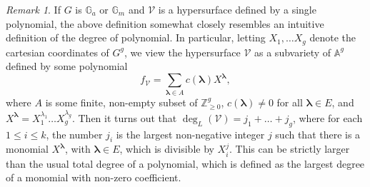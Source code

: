 \documentclass[12pt, reqno]{amsart}
\newcommand{\G}{\mathbb{G}}
\renewcommand{\P}{\mathbb{P}}
\renewcommand{\vec}[1]{\mathbf{#1}}
\newcommand{\Z}{\mathbb{Z}}
\renewcommand{\vec}{\bm}
\theoremstyle{remark}
\newtheorem{remark}[theorem]{Remark}
\newtheorem{example}[theorem]{Example}
\theoremstyle{definition}
\numberwithin{equation}{section}
\begin{document}


        

\begin{remark} \label{exga}
If $G$ is $\G_a$ or $\G_m$ and $\mathcal{V}$ is a hypersurface defined by a single polynomial, the above definition somewhat closely resembles an intuitive definition of the degree of polynomial. In particular, letting $X_1, \dots X_g$ denote the cartesian coordinates of $G^g$, we view the hypersurface $\mathcal{V}$ as a subvariety of $\mathbb{A}^g$ defined by some polynomial 
\[ f_\mathcal{V}= 
\sum_{\vec{\lambda} \in A}c(\vec{\lambda})X^{\vec{\lambda}},\]
where $A$ is some finite, non-empty subset of $\Z_{\geq 0}^g$, $c(\vec{\lambda}) \neq 0$ for all $\vec{\lambda} \in E$, and $X^{\vec{\lambda}} = X_1^{\lambda_1} \dots X_g^{\lambda_g}$. Then it turns out that $\deg_L(\mathcal{V}) = j_1 + \dots +j_g$, where for each $1 \leq i \leq k$, the number $j_i$ is the largest non-negative integer $j$ such that there is a monomial $X^{\vec{\lambda}}$, with $\vec{\lambda} \in E$, which is divisible by $X_i^{j}$. This can be strictly larger than the usual total degree of a polynomial, which is defined as the largest degree of a monomial with non-zero coefficient.
\end{remark}
\end{document}
